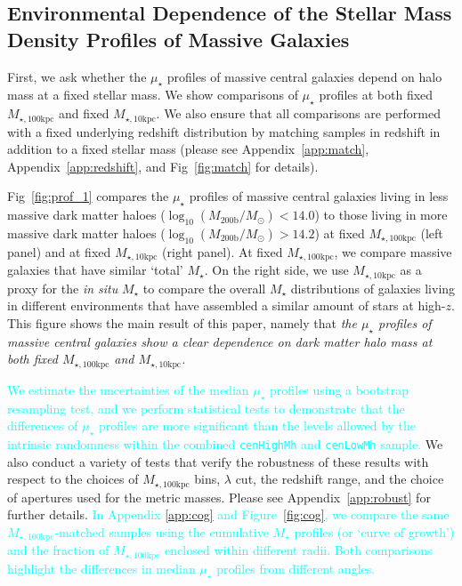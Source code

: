 \documentclass[a4paper,fleqn,usenatbib]{mnras}
\def\rbcg{\texttt{cenHighMh}}
\def\nbcg{\texttt{cenLowMh}}
\def\mstar{{$M_{\star}$}}
\def\logmh{{$\log_{10} (M_{\mathrm{200b}}/M_{\odot})$}}
\def\minn{{$M_{\star,10\mathrm{kpc}}$}}
\def\mtot{{$M_{\star,100\mathrm{kpc}}$}}
\def\mden{{$\mu_{\star}$}}
\newcommand{\song}[1]{\textcolor{cyan}{#1}}
\begin{document}
\subsection{Environmental Dependence of the Stellar Mass Density Profiles of Massive 
            Galaxies}
    \label{ssec:sbp_mtot} 
       
    First, we ask whether the \mden{} profiles of massive central galaxies depend on 
    halo mass at a fixed stellar mass.    
    We show comparisons of \mden{} profiles at both fixed \mtot{} and fixed 
    \minn{}. 
    We also ensure that all comparisons are performed with a fixed underlying redshift
    distribution by matching samples in redshift in addition to a fixed stellar mass
    (please see Appendix~\ref{app:match}, Appendix~\ref{app:redshift}, 
    and Fig~\ref{fig:match} for details). 
   
    Fig~\ref{fig:prof_1} compares the \mden{} profiles of massive central galaxies 
    living in less massive dark matter haloes (\logmh$<14.0$) to those living in more 
    massive dark matter haloes (\logmh$>14.2$) at fixed \mtot{} (left panel) and at 
    fixed \minn{} (right panel). 
    At fixed \mtot{}, we compare massive galaxies that have similar `total' \mstar{}. 
    On the right side, we use \minn{} as a proxy for the \textit{in situ} \mstar{} to 
    compare the overall \mstar{} distributions of galaxies living in different 
    environments that have assembled a similar amount of stars at high-$z$.
    This figure shows the main result of this paper, namely that 
    \emph{the \mden{} profiles of massive central galaxies show a clear dependence on 
    dark matter halo mass at both fixed \mtot{} and \minn{}.}

    \song{
    We estimate the uncertainties of the median \mden{} profiles using a bootstrap 
    resampling test, and we perform statistical tests to demonstrate that the 
    differences of \mden{} profiles are more significant than the levels allowed by 
    the intrinsic randomness within the combined \rbcg{} and \nbcg{} sample. 
    }
    We also conduct a variety of tests that verify the robustness of these results with
    respect to the choices of \mtot{} bins, $\lambda$ cut, the redshift range, and the 
    choice of apertures used for the metric masses. 
    Please see Appendix~\ref{app:robust} for further details.
    \song{
    In Appendix \ref{app:cog} and Figure~\ref{fig:cog}, we compare the same 
    \mtot{}-matched samples using the cumulative \mstar{} profiles (or `curve of growth') 
    and the fraction of \mtot{} enclosed within different radii.
    Both comparisons highlight the differences in median \mden{} profiles 
    from different angles.   
    }
   
\end{document}
